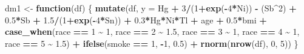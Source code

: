 \documentclass[12pt, twoside]{amherstthesis}
\newenvironment{Shaded}{\begin{snugshade}}{\end{snugshade}}
\newcommand{\AttributeTok}[1]{\textcolor[rgb]{0.13,0.29,0.53}{#1}}
\newcommand{\ControlFlowTok}[1]{\textcolor[rgb]{0.13,0.29,0.53}{\textbf{#1}}}
\newcommand{\DecValTok}[1]{\textcolor[rgb]{0.00,0.00,0.81}{#1}}
\newcommand{\FloatTok}[1]{\textcolor[rgb]{0.00,0.00,0.81}{#1}}
\newcommand{\FunctionTok}[1]{\textcolor[rgb]{0.13,0.29,0.53}{\textbf{#1}}}
\newcommand{\NormalTok}[1]{#1}
\newcommand{\OtherTok}[1]{\textcolor[rgb]{0.56,0.35,0.01}{#1}}
\newcommand{\SpecialCharTok}[1]{\textcolor[rgb]{0.81,0.36,0.00}{\textbf{#1}}}
\begin{document}
\begin{Shaded}
\begin{Highlighting}[]
\NormalTok{dm1 }\OtherTok{\textless{}{-}} \ControlFlowTok{function}\NormalTok{(df) \{}
  \FunctionTok{mutate}\NormalTok{(df, }\AttributeTok{y =} 
\NormalTok{           Hg }\SpecialCharTok{+} \DecValTok{3}\SpecialCharTok{/}\NormalTok{(}\DecValTok{1}\SpecialCharTok{+}\FunctionTok{exp}\NormalTok{(}\SpecialCharTok{{-}}\DecValTok{4}\SpecialCharTok{*}\NormalTok{Ni)) }\SpecialCharTok{{-}}\NormalTok{ (Sb}\SpecialCharTok{\^{}}\DecValTok{2}\NormalTok{) }\SpecialCharTok{+} \FloatTok{0.5}\SpecialCharTok{*}\NormalTok{Sb }\SpecialCharTok{+} \FloatTok{1.5}\SpecialCharTok{/}\NormalTok{(}\DecValTok{1}\SpecialCharTok{+}\FunctionTok{exp}\NormalTok{(}\SpecialCharTok{{-}}\DecValTok{4}\SpecialCharTok{*}\NormalTok{Sn)) }\SpecialCharTok{+} 
           \FloatTok{0.3}\SpecialCharTok{*}\NormalTok{Hg}\SpecialCharTok{*}\NormalTok{Ni}\SpecialCharTok{*}\NormalTok{Tl }\SpecialCharTok{+} 
\NormalTok{           age }\SpecialCharTok{+} \FloatTok{0.5}\SpecialCharTok{*}\NormalTok{bmi }\SpecialCharTok{+} 
           \FunctionTok{case\_when}\NormalTok{(race }\SpecialCharTok{==} \DecValTok{1} \SpecialCharTok{\textasciitilde{}} \DecValTok{1}\NormalTok{, }
\NormalTok{                     race }\SpecialCharTok{==} \DecValTok{2} \SpecialCharTok{\textasciitilde{}} \FloatTok{1.5}\NormalTok{, }
\NormalTok{                     race }\SpecialCharTok{==} \DecValTok{3} \SpecialCharTok{\textasciitilde{}} \DecValTok{1}\NormalTok{, }
\NormalTok{                     race }\SpecialCharTok{==} \DecValTok{4} \SpecialCharTok{\textasciitilde{}} \DecValTok{1}\NormalTok{, }
\NormalTok{                     race }\SpecialCharTok{==} \DecValTok{5} \SpecialCharTok{\textasciitilde{}} \FloatTok{1.5}\NormalTok{) }\SpecialCharTok{+}
           \FunctionTok{ifelse}\NormalTok{(smoke }\SpecialCharTok{==} \DecValTok{1}\NormalTok{, }\SpecialCharTok{{-}}\DecValTok{1}\NormalTok{, }\FloatTok{0.5}\NormalTok{) }\SpecialCharTok{+}
           \FunctionTok{rnorm}\NormalTok{(}\FunctionTok{nrow}\NormalTok{(df), }\DecValTok{0}\NormalTok{, }\DecValTok{5}\NormalTok{))}
\NormalTok{\}}


\end{Highlighting}
\end{Shaded}
\end{document}
